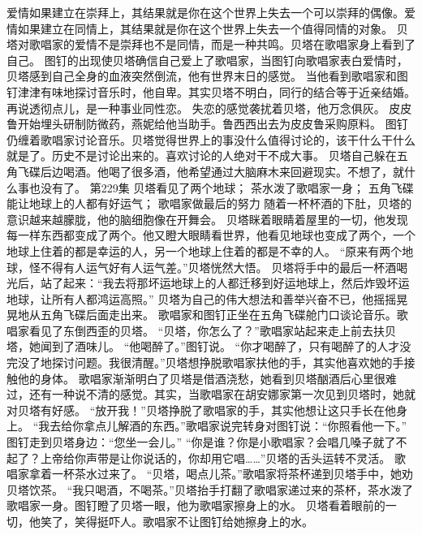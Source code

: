 \documentclass[a4paper,12pt,UTF8,twoside]{ctexbook}
\begin{document}
        爱情如果建立在崇拜上，其结果就是你在这个世界上失去一个可以崇拜的偶像。爱情如果建立在同情上，其结果就是你在这个世界上失去一个值得同情的对象。  
        贝塔对歌唱家的爱情不是崇拜也不是同情，而是一种共鸣。贝塔在歌唱家身上看到了自己。  
        图钉的出现使贝塔确信自己爱上了歌唱家，当图钉向歌唱家表白爱情时，贝塔感到自己全身的血液突然倒流，他有世界末日的感觉。  
        当他看到歌唱家和图钉津津有味地探讨音乐时，他自卑。其实贝塔不明白，同行的结合等于近亲结婚。再说透彻点儿，是一种事业同性恋。  
        失恋的感觉袭扰着贝塔，他万念俱灰。  
        皮皮鲁开始埋头研制防微药，燕妮给他当助手。鲁西西出去为皮皮鲁采购原料。  
        图钉仍缠着歌唱家讨论音乐。贝塔觉得世界上的事没什么值得讨论的，该干什么干什么就是了。历史不是讨论出来的。喜欢讨论的人绝对干不成大事。  
        贝塔自己躲在五角飞碟后边喝酒。他喝了很多酒，他希望通过大脑麻木来回避现实。不想了，就什么事也没有了。          第229集  
        贝塔看见了两个地球；  
        茶水泼了歌唱家一身；  
        五角飞碟能让地球上的人都有好运气；  
        歌唱家做最后的努力    
        随着一杯杯酒的下肚，贝塔的意识越来越朦胧，他的脑细胞像在开舞会。  
        贝塔眯着眼睛着屋里的一切，他发现每一样东西都变成了两个。他又瞪大眼睛看世界，他看见地球也变成了两个，一个地球上住着的都是幸运的人，另一个地球上住着的都是不幸的人。  
        “原来有两个地球，怪不得有人运气好有人运气差。”贝塔恍然大悟。  
        贝塔将手中的最后一杯酒喝光后，站了起来：“我去将那坏运地球上的人都迁移到好运地球上，然后炸毁坏运地球，让所有人都鸿运高照。”        
        贝塔为自己的伟大想法和善举兴奋不已，他摇摇晃晃地从五角飞碟后面走出来。  
        歌唱家和图钉正坐在五角飞碟舱门口谈论音乐。歌唱家看见了东倒西歪的贝塔。  
        “贝塔，你怎么了？”歌唱家站起来走上前去扶贝塔，她闻到了酒味儿。  
        “他喝醉了。”图钉说。  
        “你才喝醉了，只有喝醉了的人才没完没了地探讨问题。我很清醒。”贝塔想挣脱歌唱家扶他的手，其实他喜欢她的手接触他的身体。  
        歌唱家渐渐明白了贝塔是借酒浇愁，她看到贝塔酗酒后心里很难过，还有一种说不清的感觉。其实，当歌唱家在胡安娜家第一次见到贝塔时，她就对贝塔有好感。  
        “放开我！”贝塔挣脱了歌唱家的手，其实他想让这只手长在他身上。  
        “我去给你拿点儿解酒的东西。”歌唱家说完转身对图钉说：“你照看他一下。”  
        图钉走到贝塔身边：“您坐一会儿。”  
        “你是谁？你是小歌唱家？会唱几嗓子就了不起了？上帝给你声带是让你说话的，你却用它唱……”贝塔的舌头运转不灵活。  
        歌唱家拿着一杯茶水过来了。  
        “贝塔，喝点儿茶。”歌唱家将茶杯递到贝塔手中，她劝贝塔饮茶。  
        “我只喝酒，不喝茶。”贝塔抬手打翻了歌唱家递过来的茶杯，茶水泼了歌唱家一身。图钉瞪了贝塔一眼，他为歌唱家擦身上的水。  
        贝塔看着眼前的一切，他笑了，笑得挺吓人。歌唱家不让图钉给她擦身上的水。  
\end{document}
